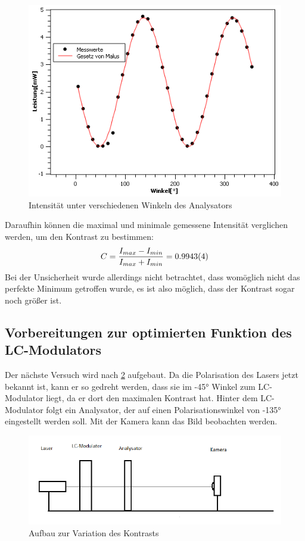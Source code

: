 \begin{figure}[h!]
	\centering
	\includegraphics[scale=0.6]{GesetzvonMalus.png}
	\caption{Intensität unter verschiedenen Winkeln des Analysators}
	\label{Malus}
\end{figure}

Daraufhin können die maximal und minimale gemessene Intensität verglichen werden, um den Kontrast zu bestimmen:
\begin{equation}
	C = \frac{I_{max} - I_{min}}{I_{max} + I_{min}} = \SI{0,9943 \pm 0,0004}{}
	\label{eq:Kontrast}
\end{equation}
Bei der Unsicherheit wurde allerdings nicht betrachtet, dass womöglich nicht das perfekte Minimum getroffen wurde, es ist also möglich, dass der Kontrast sogar noch größer ist. 

\subsection{Vorbereitungen zur optimierten Funktion des LC-Modulators}
Der nächste Versuch wird nach \cref{412} aufgebaut. Da die Polarisation des Lasers jetzt bekannt ist, kann er so gedreht werden, dass sie im -45° Winkel zum LC-Modulator liegt, da er dort den maximalen Kontrast hat. Hinter dem LC-Modulator folgt ein Analysator, der auf einen Polarisationswinkel von -135° eingestellt werden soll. Mit der Kamera kann das Bild beobachten werden.

\begin{figure}[h!]
	\centering
	\includegraphics[scale=0.6]{4.1.2-Aufbau.png}
	\caption{Aufbau zur Variation des Kontrasts}
	\label{412}
\end{figure}

